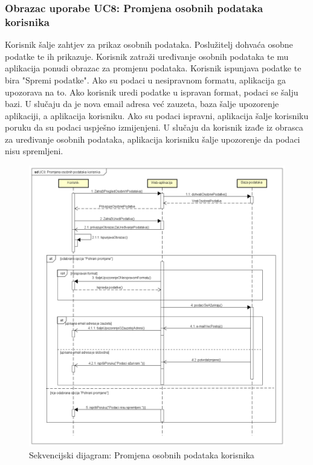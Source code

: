 			\subsubsection{Obrazac uporabe UC8: Promjena osobnih podataka korisnika}
			Korisnik šalje zahtjev za prikaz osobnih podataka. Poslužitelj dohvaća osobne podatke te ih prikazuje. Korisnik zatraži uređivanje osobnih podataka te mu aplikacija ponudi obrazac za promjenu podataka. Korisnik ispunjava podatke te bira "Spremi podatke". Ako su podaci u nesipravnom formatu, aplikacija ga upozorava na to. Ako korisnik uredi podatke u ispravan format, podaci se šalju bazi. U slučaju da je nova email adresa već zauzeta, baza šalje upozorenje aplikaciji, a aplikacija korisniku. Ako su podaci ispravni, aplikacija šalje korisniku poruku da su podaci uspješno izmijenjeni. U slučaju da korisnik izađe iz obrasca za uređivanje osobnih podataka, aplikacija korisniku šalje upozorenje da podaci nisu spremljeni.
			\begin{figure}[H]
				\includegraphics[scale=0.5]{dijagrami/SD1.png} %
				\caption{Sekvencijski dijagram: Promjena osobnih podataka korisnika}
				\label{fig:SD1} %
			\end{figure}
		
